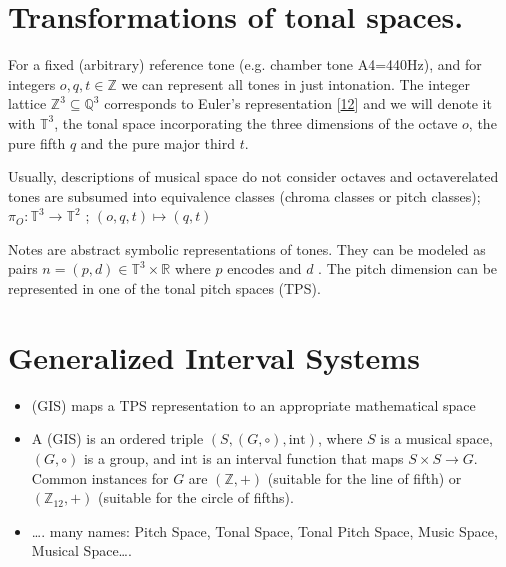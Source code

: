 \documentclass[letterpaper,10pt,english]{sphinxmanual}
\begin{document}
\section{Transformations of tonal spaces.}
\label{\detokenize{5_notes:transformations-of-tonal-spaces}}
\sphinxAtStartPar
For a fixed (arbitrary) reference tone (e.g. chamber tone A4=440Hz), and
for integers \(o, q, t \in \mathbb Z\) we can represent all tones in
just intonation. The integer lattice
\(\mathbb Z^3 \subseteq \mathbb Q^3\) corresponds to Euler’s
representation {[}\hyperlink{cite.8_bibliography:id5}{12}{]} and we will denote it with
\(\mathbb T^3\), the tonal space incorporating the three dimensions
of the octave \(o\), the pure fifth \(q\) and the pure major
third \(t\).

\sphinxAtStartPar
Usually, descriptions of musical space do not consider octaves and
octave\sphinxhyphen{}related tones are subsumed into equivalence classes (chroma
classes or pitch classes); \(\pi_O: \mathbb T^3 \to \mathbb T^2\) ;
\((o, q, t) \mapsto (q, t)\)

\sphinxAtStartPar
Notes are abstract symbolic representations of tones. They can be
modeled as pairs \(n=(p, d)\in \mathbb T^3 \times \mathbb R\) where
\(p\) encodes  and \(d\) . The pitch
dimension can be represented in one of the tonal pitch spaces (TPS).


\section{Generalized Interval Systems}
\label{\detokenize{5_notes:generalized-interval-systems}}\begin{itemize}
\item {} 
\sphinxAtStartPar
(GIS) maps a TPS representation to an appropriate mathematical space

\item {} 
\sphinxAtStartPar
A  (GIS) is an ordered triple
\((S, (G, \circ), \text{int})\), where \(S\) is a musical
space, \((G, \circ)\) is a group, and \(\text{int}\) is an
interval function that maps \(S \times S \to G\). Common
instances for \(G\) are \((\mathbb Z, +)\) (suitable for the
line of fifth) or \((\mathbb{Z}_{12}, +)\) (suitable for the
circle of fifths).

\item {} 
\sphinxAtStartPar
…. many names: Pitch Space, Tonal Space, Tonal Pitch Space, Music
Space, Musical Space….

\end{itemize}
\end{document}
